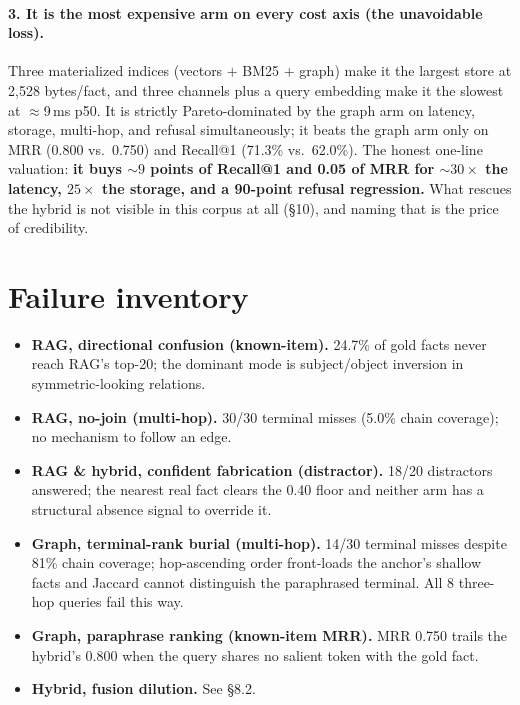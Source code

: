 \documentclass[11pt]{article}
\begin{document}
\paragraph{3. It is the most expensive arm on every cost axis (the unavoidable loss).} Three
materialized indices (vectors $+$ BM25 $+$ graph) make it the largest store at 2{,}528
bytes/fact, and three channels plus a query embedding make it the slowest at $\approx$9\,ms
p50. It is strictly Pareto-dominated by the graph arm on latency, storage, multi-hop, and
refusal simultaneously; it beats the graph arm only on MRR (0.800 vs.\ 0.750) and Recall@1
(71.3\% vs.\ 62.0\%). The honest one-line valuation: \textbf{it buys ${\sim}9$ points of
Recall@1 and 0.05 of MRR for ${\sim}30\times$ the latency, $25\times$ the storage, and a
90-point refusal regression.} What rescues the hybrid is not visible in this corpus at all
(\S10), and naming that is the price of credibility.

\section{Failure inventory}
\begin{itemize}
  \item \textbf{RAG, directional confusion (known-item).} 24.7\% of gold facts never reach
  RAG's top-20; the dominant mode is subject/object inversion in symmetric-looking relations.
  \item \textbf{RAG, no-join (multi-hop).} 30/30 terminal misses (5.0\% chain coverage); no
  mechanism to follow an edge.
  \item \textbf{RAG \& hybrid, confident fabrication (distractor).} 18/20 distractors
  answered; the nearest real fact clears the 0.40 floor and neither arm has a structural
  absence signal to override it.
  \item \textbf{Graph, terminal-rank burial (multi-hop).} 14/30 terminal misses despite 81\%
  chain coverage; hop-ascending order front-loads the anchor's shallow facts and Jaccard
  cannot distinguish the paraphrased terminal. All 8 three-hop queries fail this way.
  \item \textbf{Graph, paraphrase ranking (known-item MRR).} MRR 0.750 trails the hybrid's
  0.800 when the query shares no salient token with the gold fact.
  \item \textbf{Hybrid, fusion dilution.} See \S8.2.
\end{itemize}
\end{document}
